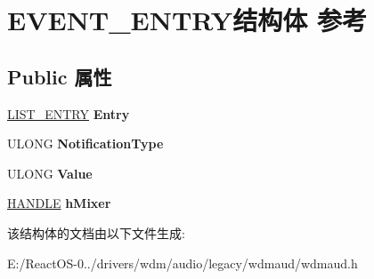\hypertarget{struct_e_v_e_n_t___e_n_t_r_y}{}\section{E\+V\+E\+N\+T\+\_\+\+E\+N\+T\+R\+Y结构体 参考}
\label{struct_e_v_e_n_t___e_n_t_r_y}
\subsection*{Public 属性}
\begin{DoxyCompactItemize}
\item 
\mbox{\label{struct_e_v_e_n_t___e_n_t_r_y_ab09dd8602e4a9b588adad256f32498f2}} 
\hyperlink{struct___l_i_s_t___e_n_t_r_y}{L\+I\+S\+T\+\_\+\+E\+N\+T\+RY} {\bfseries Entry}
\item 
\mbox{\label{struct_e_v_e_n_t___e_n_t_r_y_af6dab962b9ae038da8da4a9d5ab0a59d}} 
U\+L\+O\+NG {\bfseries Notification\+Type}
\item 
\mbox{\label{struct_e_v_e_n_t___e_n_t_r_y_a1defdc89264197944bcb254922ef4ce7}} 
U\+L\+O\+NG {\bfseries Value}
\item 
\mbox{\label{struct_e_v_e_n_t___e_n_t_r_y_aa3f472afd096f7be16c50bf23d9bcb26}} 
\hyperlink{interfacevoid}{H\+A\+N\+D\+LE} {\bfseries h\+Mixer}
\end{DoxyCompactItemize}


该结构体的文档由以下文件生成\+:\begin{DoxyCompactItemize}
\item 
E\+:/\+React\+O\+S-\/0../drivers/wdm/audio/legacy/wdmaud/wdmaud.\+h\end{DoxyCompactItemize}
